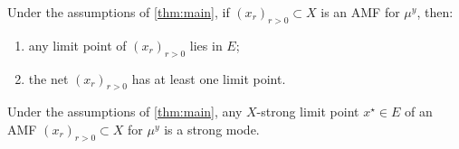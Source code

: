 \documentclass[10pt,a4paper]{amsart}
\begin{document}
\begin{lemma}
	\label{lem:AMF_has_limit_point}
	Under the assumptions of \cref{thm:main}, if $(x_r)_{r > 0} \subset X$ is an AMF for $\mu^y$, then:
	\begin{enumerate}[label=(\alph*)]
		\item any limit point of $(x_r)_{r > 0}$ lies in $E$;
		\item the net $(x_r)_{r > 0}$ has at least one limit point.
	\end{enumerate}
\end{lemma}

\begin{lemma}
	\label{lem:AMF_limit_point_is_strong}
	Under the assumptions of \cref{thm:main}, any $X$-strong limit point $x^{\star} \in E$ of an AMF $(x_r)_{r > 0} \subset X$ for $\mu^y$ is a strong mode.
\end{lemma}
\end{document}
